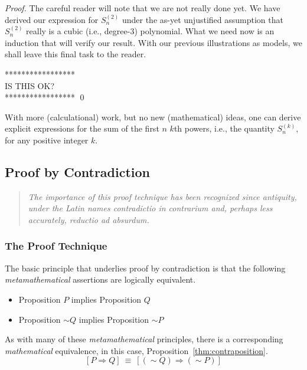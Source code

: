 \begin{proof}
\medskip

The careful reader will note that we are not really done yet.  We
have derived our expression for $S^{(2)}_n$ under the as-yet
unjustified assumption that $S^{(2)}_n$ really is a cubic (i.e.,
degree-$3$) polynomial.  What we need now is an induction that will
verify our result.  With our previous illustrations as models, we
shall leave this final task to the reader.

\noindent
***************** \\
IS THIS OK? \\
***************** 
\qed
\end{proof}

With more (calculational) work, but no new (mathematical) ideas, one
can derive explicit expressions for the sum of the first $n$ $k$th
powers, i.e., the quantity $S^{(k)}_n$, for any positive integer $k$.


\subsection{Proof by Contradiction}
\label{sec:Contradiction}

\begin{quote}
{\em The importance of this proof technique has been recognized since
  antiquity, under the Latin names {\em contradictio in contrarium}
  and, perhaps less accurately, {\em reductio ad absurdum}.}
\end{quote}



\subsubsection{The Proof Technique}
\label{sec:contradiction-technique}



The basic principle that underlies proof by contradiction is that the
following {\em metamathematical} assertions are logically equivalent.
\begin{itemize}
\item
Proposition $P$ {\sc implies} Proposition $Q$
\item
Proposition $\sim Q$ {\sc implies} Proposition $\sim P$
\end{itemize}

As with many of these {\em metamathematical} principles, there is a
corresponding {\em mathematical} equivalence, in this case,
Proposition~\ref{thm:contraposition}.
\[ [P \Rightarrow Q] \ \equiv \ [(\sim Q) \Rightarrow (\sim P)] \]


